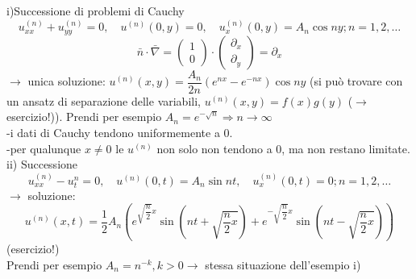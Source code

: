 \documentclass[a4paper,11pt]{report}
\begin{document}
i)Successione di problemi di Cauchy\\
$$ u_{xx}^{(n)} + u_{yy}^{(n)}=0, \quad u^{(n)}(0,y)=0, \quad u_x^{(n)}(0,y)=A_n\cos ny; n=1,2,\dots $$
$$
\bar{n}\cdot \bar{\nabla} = \left(\begin{matrix}
1 \\ 0
\end{matrix}\right) \cdot \left( \begin{matrix}
\partial_x \\ \partial_y
\end{matrix}\right)=\partial_x
$$
$\rightarrow$ unica soluzione: $u^{(n)}(x,y)=\dfrac{A_n}{2n}(e^{nx}-e^{-nx})\cos ny $
(si può trovare con un ansatz di separazione delle variabili, $u^{(n)}(x,y)=f(x)g(y)$ ($\rightarrow$ esercizio!)). Prendi per esempio $A_n=e^{-\sqrt{n}} \Rightarrow n\to \infty$ \\
-i dati di Cauchy tendono uniformemente a 0.\\
-per qualunque $x\neq 0$ le $u^{(n)}$ non solo non tendono a 0, ma non restano limitate.
ii) Successione 
$$
u_{xx}^{(n)} - u_t^{n}=0, \quad u^{(n)}(0,t)=A_n\sin nt, \quad u_x^{(n)}(0,t)=0;n=1,2,\dots
$$
$\rightarrow$ soluzione: 
$$
u^{(n)}(x,t) =\dfrac{1}{2}A_n\left(e^{\sqrt{\dfrac{n}{2}}x}\sin\left(nt+\sqrt{\dfrac{n}{2}x}\right) + e^{-\sqrt{\dfrac{n}{2}}x}\sin\left(nt-\sqrt{\dfrac{n}{2}x}\right)\right) 
$$
(esercizio!)\\
Prendi per esempio $A_n=n^{-k}, k>0 \rightarrow$ stessa situazione dell'esempio i)

\end{document}

